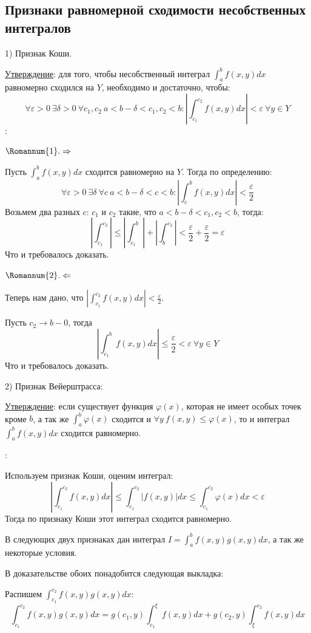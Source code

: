 \documentclass[12pt]{article}
\begin{document}
\subsection{Признаки равномерной сходимости несобственных интегралов}
1) Признак Коши.\par
\uline{Утверждение}: для того, чтобы несобственный интеграл $\int_a^b f(x,y) dx$ равномерно сходился на $Y$, необходимо и достаточно, чтобы:
$$\forall \varepsilon > 0 \ \exists \delta > 0 \ \forall c_1, c_2 \ a < b-\delta < c_1,c_2<b : |\int_{c_1}^{c_2} f(x,y) dx | < \varepsilon \ \forall y \in Y$$
:\par
$\Romannum{1}. \Rightarrow$\par
Пусть $\int_a^b f(x,y)dx$ сходится равномерно на $Y$. Тогда по определению:
$$\forall \varepsilon > 0 \ \exists \delta \ \forall c \ a < b -\delta < c < b : |\int_c^b f(x,y) dx| < \frac{\varepsilon}{2}$$
Возьмем два разных $c$: $c_1$ и $c_2$ такие, что $a < b-\delta < c_1,c_2 < b$, тогда:
$$|\int_{c_1}^{c_2}| \leq |\int_{c_1}^b| + |\int_b^{c_2}| < \frac{\varepsilon}{2} + \frac{\varepsilon}{2} = \varepsilon$$
Что и требовалось доказать.\par
$\Romannum{2}. \Leftarrow$\par
Теперь нам дано, что $|\int_{c_1}^{c_2} f(x,y) dx| < \frac{\varepsilon}{2}$.\par
Пусть $c_2 \to b-0$, тогда
$$|\int_{c_1}^b f(x,y) dx | \leq \frac{\varepsilon}{2} < \varepsilon \ \forall y \in Y$$
Что и требовалось доказать.\par
2) Признак Вейерштрасса:\par
\uline{Утверждение}: если существует функция $\varphi(x)$, которая не имеет особых точек кроме $b$, а так же $\int_a^b \varphi(x)$ сходится и $\forall y \ f(x,y) \leq \varphi(x)$, то и интеграл $\int_a^b f(x,y) dx$ сходится равномерно.\par
{}:\par
Используем признак Коши, оценим интеграл:
$$|\int_{c_1}^{c_2} f(x,y) dx| \leq \int_{c_1}^{c_2} |f(x,y)| dx \leq \int_{c_1}^{c_2} \varphi(x) dx < \varepsilon$$
Тогда по признаку Коши этот интеграл сходится равномерно.\par
В следующих двух признаках дан интеграл $I = \int_a^b f(x,y) g(x,y) dx$, а так же некоторые условия.\par
В доказательстве обоих понадобится следующая выкладка:\par
Распишем $\int_{c_1}^{c_2} f(x,y) g(x,y) dx$:
$$\int_{c_1}^{c_2} f(x,y) g(x,y) dx = g(c_1,y) \int_{c_1}^{\xi} f(x,y) dx + g(c_2,y) \int_{\xi}^{c_2} f(x,y)dx$$
\end{document}
